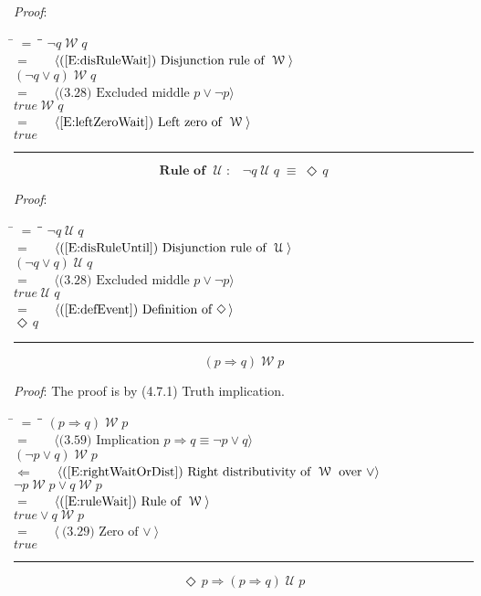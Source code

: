 \documentclass[12pt, fleqn, leqno]{article}
\newcommand{\lgap}{2pt}                             %
\newcommand{\mymathindent}{24pt}                    %
\newcommand{\equivs}{\ensuremath{\;\equiv\;}}       %
\newcommand{\impl}{\ensuremath{\Rightarrow}}        %
\newcommand{\foll}{\ensuremath{\Leftarrow}}         %
\newcommand{\Until}{\;\mathcal{U}\;}
\newcommand{\Wait}{\;\mathcal{W}\;}
\newcommand{\Event}{\Diamond\,}
\newcommand{\myqed}{\rule[-.23ex]{1.2ex}{2.0ex}}
\newcommand{\myqedtab}{\hspace{384pt}}              %
\newcommand{\Gll} {\langle}                         %
\newcommand{\Ggg} {\rangle}                         %
\newcommand{\Hint}[1]     {\ \ \ $\Gll              \mbox{#1} \Ggg$ }   %
\begin{document}
\emph{Proof}:
\begin{tabbing}
\hspace{\mymathindent} \= $= \;$ \= \myqedtab \= \kill
\> \> $\neg q\Wait q$\\[\lgap]
\> $=$ \> \Hint{(\ref{E:disRuleWait}) Disjunction rule of $\Wait$} \\[\lgap]
\> \> $(\neg q\lor q)\Wait q$\\[\lgap]
\> $=$ \> \Hint{(3.28) Excluded middle $p\lor \neg p$} \\[\lgap]
\> \> $true\Wait q$\\[\lgap]
\> $=$ \> \Hint{\ref{E:leftZeroWait}) Left zero of $\Wait$} \\[\lgap]
\> \> $true$ \quad \myqed
\end{tabbing}
\begin{equation}\label{E:ruleUntil}
\textbf{Rule of $\Until$:}\quad \neg q \Until q\equivs \Event q
\end{equation}

\emph{Proof}:
\begin{tabbing}
\hspace{\mymathindent} \= $= \;$ \= \myqedtab \= \kill
\> \> $\neg q\Until q$\\[\lgap]
\> $=$ \> \Hint{(\ref{E:disRuleUntil}) Disjunction rule of $\Until$} \\[\lgap]
\> \> $(\neg q\lor q)\Until q$\\[\lgap]
\> $=$ \> \Hint{(3.28) Excluded middle $p\lor \neg p$} \\[\lgap]
\> \> $true\Until q$\\[\lgap]
\> $=$ \> \Hint{(\ref{E:defEvent}) Definition of $\Event$} \\[\lgap]
\> \> $\Event q$ \quad \myqed
\end{tabbing}
\begin{equation}\label{E:pImplQWaitP}
(p\impl q)\Wait p
\end{equation}

\emph{Proof}: The proof is by (4.7.1) Truth implication.
\begin{tabbing}
\hspace{\mymathindent} \= $= \;$ \= \myqedtab \= \kill
\> \> $(p\impl q)\Wait p$\\[\lgap]
\> $=$ \> \Hint{(3.59) Implication $p\impl q\equiv \neg p\lor q$} \\[\lgap]
\> \> $(\neg p \lor q)\Wait p$\\[\lgap]
\> $\foll$ \> \Hint{(\ref{E:rightWaitOrDist}) Right distributivity of $\Wait$ over $\lor$} \\[\lgap]
\> \> $\neg p \Wait p\lor q\Wait p$\\[\lgap]
\> $=$ \> \Hint{(\ref{E:ruleWait}) Rule of $\Wait$} \\[\lgap]
\> \> $true\lor q\Wait p$\\[\lgap]
\> $=$ \> \Hint{(3.29) Zero of $\lor$} \\[\lgap]
\> \> $true$ \quad \myqed
\end{tabbing}
\begin{equation}\label{E:eventPImplPImplUntilp}
\Event p\impl(p\impl q)\Until p
\end{equation}
\end{document}
